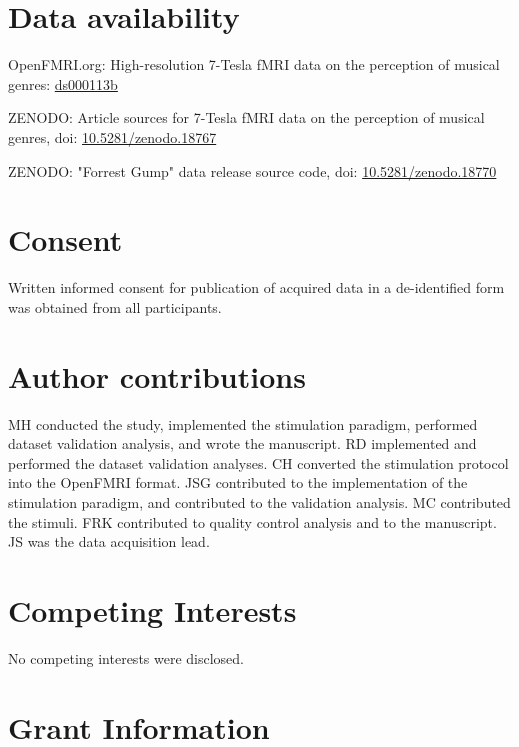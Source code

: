 \documentclass[10pt,a4paper,twocolumn]{article}
\begin{document}
\section*{Data availability}

OpenFMRI.org: High-resolution 7-Tesla fMRI data on the perception of musical
genres: \href{http://openfmri.org/dataset/ds000113b}{ds000113b}\cite{ds113b}

ZENODO: Article sources for 7-Tesla fMRI data on the perception of musical genres, doi: \href{http://dx.doi.org/10.5281/zenodo.18767}{10.5281/zenodo.18767}\cite{articlesrc}

ZENODO: "Forrest Gump" data release source code, doi:
\href{http://dx.doi.org/10.5281/zenodo.18770}{10.5281/zenodo.18770}\cite{gumpdata}

\section*{Consent}

Written informed consent for publication of acquired data in a de-identified
form was obtained from all participants.

\section*{Author contributions}

MH conducted the study, implemented the stimulation paradigm, performed dataset validation analysis, and wrote the manuscript.
RD implemented and performed the dataset validation analyses.
CH converted the stimulation protocol into the OpenFMRI format.
JSG contributed to the implementation of the stimulation paradigm, and contributed to the validation analysis.
MC contributed the stimuli.
FRK contributed to quality control analysis and to the manuscript.
JS was the data acquisition lead.

\section*{Competing Interests}
No competing interests were disclosed.

\section*{Grant Information}
\end{document}
